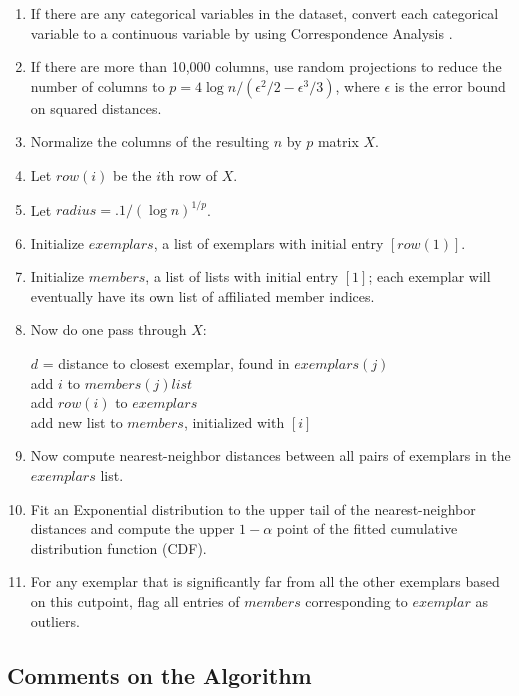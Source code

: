 \documentclass[12pt]{article}
\begin{document}
\begin{enumerate}
\item If there are any categorical variables in the dataset, convert each categorical variable to a continuous variable by using Correspondence Analysis \cite{CA}.
\item If there are more than 10,000 columns, use random projections to reduce the number of columns to $p = 4 \log{n} / (\epsilon^2/2 - \epsilon^3/3)$, where $\epsilon$ is the error bound on squared distances.
\item Normalize the columns of the resulting $n$ by $p$ matrix $X$.
\item Let $row(i)$ be the $i$th row of $X$.
\item Let $radius = .1 / (\log{n})^{1/p}$.
\item Initialize $exemplars$, a list of exemplars with initial entry $[row(1)]$.
\item Initialize $members$, a list of lists with initial entry $[1]$; each exemplar will eventually have its own list of affiliated member indices.
\item Now do one pass through $X$:\\
\begin{algorithm}[h]
  {
 $d$ = distance to closest exemplar, found in $exemplars(j)$\\
 {
add $i$ to $members(j) list$\\
}  {
add $row(i)$ to $exemplars$\\
add new list to $members$, initialized with $[i]$\\
 }
 }
\end{algorithm}
\item Now compute nearest-neighbor distances between all pairs of exemplars in the $exemplars$ list.
\item Fit an Exponential distribution to the upper tail of the nearest-neighbor distances and compute the upper $1 - \alpha$ point of the fitted cumulative distribution function (CDF).
\item For any exemplar that is significantly far from all the other exemplars based on this cutpoint, flag all entries of $members$ corresponding to $exemplar$ as outliers.
\end{enumerate}

\subsection{Comments on the Algorithm}
\end{document}
